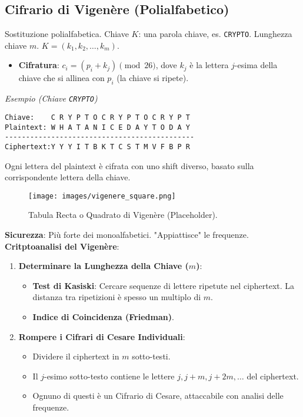 \subsection{Cifrario di Vigenère (Polialfabetico)}
Sostituzione polialfabetica. Chiave $K$: una parola chiave, es. \texttt{CRYPTO}.
Lunghezza chiave $m$. $K = (k_1, k_2, \dots, k_m)$.
\begin{itemize}
    \item \textbf{Cifratura}: $c_i = (p_i + k_j) \pmod{26}$, dove $k_j$ è la lettera $j$-esima della chiave che si allinea con $p_i$ (la chiave si ripete).
\end{itemize}
\textit{Esempio (Chiave \texttt{CRYPTO})}
\begin{verbatim}
Chiave:    C R Y P T O C R Y P T O C R Y P T
Plaintext: W H A T A N I C E D A Y T O D A Y
---------------------------------------------
Ciphertext:Y Y Y I T B K T C S T M V F B P R
\end{verbatim}
Ogni lettera del plaintext è cifrata con uno shift diverso, basato sulla corrispondente lettera della chiave.
\begin{figure}[H]
    \centering
    \texttt{[image: images/vigenere\_square.png]} %
    \caption{Tabula Recta o Quadrato di Vigenère (Placeholder).}
    \label{fig:vigenere_square}
\end{figure}

\textbf{Sicurezza}: Più forte dei monoalfabetici. "Appiattisce" le frequenze.
\textbf{Critptoanalisi del Vigenère}:
\begin{enumerate}
    \item \textbf{Determinare la Lunghezza della Chiave ($m$)}:
    \begin{itemize}
        \item \textbf{Test di Kasiski}: Cercare sequenze di lettere ripetute nel ciphertext. La distanza tra ripetizioni è spesso un multiplo di $m$.
        \item \textbf{Indice di Coincidenza (Friedman)}.
    \end{itemize}
    \item \textbf{Rompere i Cifrari di Cesare Individuali}:
    \begin{itemize}
        \item Dividere il ciphertext in $m$ sotto-testi.
        \item Il $j$-esimo sotto-testo contiene le lettere $j, j+m, j+2m, \dots$ del ciphertext.
        \item Ognuno di questi è un Cifrario di Cesare, attaccabile con analisi delle frequenze.
    \end{itemize}
\end{enumerate}

